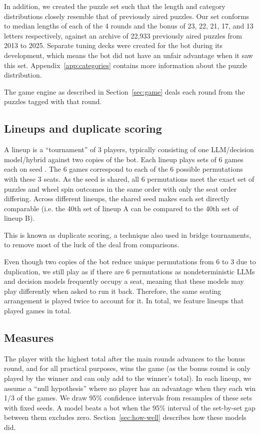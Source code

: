 In addition, we created the puzzle set such that the length and category distributions closely resemble that of previously aired puzzles. Our set conforms to median lengths of each of the 4 rounds and the bonus of 23, 22, 21, 17, and 13 letters respectively, against an archive of 22,933 previously aired puzzles from 2013 to 2025. Separate tuning decks were created for the bot during its development, which means the bot did not have an unfair advantage when it saw this set. Appendix~\ref{app:categories} contains more information about the puzzle distribution. 

The game engine as described in Section~\ref{sec:game} deals each round from the puzzles tagged with that round.


\subsection{Lineups and duplicate scoring}

A lineup is a ``tournament'' of 3 players, typically consisting of one LLM/decision model/hybrid against two copies of the bot. Each lineup plays \SetsPerLineup{} sets of 6 games each on seed \Seed{}. The 6 games correspond to each of the 6 possible permutations with these 3 seats. As the seed is shared, all 6 permutations meet the exact set of puzzles and wheel spin outcomes in the same order with only the seat order differing. Across different lineups, the shared seed makes each set directly comparable (i.e. the 40th set of lineup A can be compared to the 40th set of lineup B). 

This is known as duplicate scoring, a technique also used in bridge tournaments, to remove most of the luck of the deal from comparisons.

Even though two copies of the bot reduce unique permutations from 6 to 3 due to duplication, we still play as if there are 6 permutations as nondeterministic LLMs and decision models frequently occupy a seat, meaning that these models may play differently when asked to run it back. Therefore, the same seating arrangement is played twice to account for it. In total, we feature \NumLineups{} lineups that played \NumGames{} games in total.

\subsection{Measures}

The player with the highest total after the main rounds advances to the bonus round, and for all practical purposes, wins the game (as the bonus round is only played by the winner and can only add to the winner's total). In each lineup, we assume a ``null hypothesis'' where no player has an advantage when they each win 1/3 of the games. We draw 95\% confidence intervals from \Resamples{} resamples of these sets with fixed seeds. A model beats a bot when the 95\% interval of the set-by-set gap between them excludes zero. Section~\ref{sec:how-well} describes how these models did.
